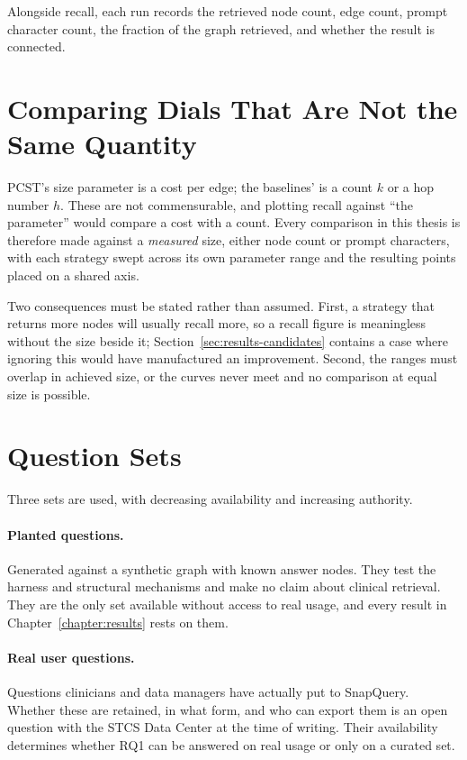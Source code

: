 Alongside recall, each run records the retrieved node count, edge count, prompt
character count, the fraction of the graph retrieved, and whether the result is
connected.

\section{Comparing Dials That Are Not the Same Quantity} \label{sec:methodology-comparability}

PCST's size parameter is a cost per edge; the baselines' is a count $k$ or a hop
number $h$. These are not commensurable, and plotting recall against ``the
parameter'' would compare a cost with a count. Every comparison in this thesis is
therefore made against a \emph{measured} size, either node count or prompt
characters, with each strategy swept across its own parameter range and the
resulting points placed on a shared axis.

Two consequences must be stated rather than assumed. First, a strategy that
returns more nodes will usually recall more, so a recall figure is meaningless
without the size beside it; Section~\ref{sec:results-candidates} contains a case
where ignoring this would have manufactured an improvement. Second, the ranges
must overlap in achieved size, or the curves never meet and no comparison at
equal size is possible.

\section{Question Sets} \label{sec:methodology-questions}

Three sets are used, with decreasing availability and increasing authority.

\paragraph{Planted questions.} Generated against a synthetic graph with known
answer nodes. They test the harness and structural mechanisms and make no claim
about clinical retrieval. They are the only set available without access to real
usage, and every result in Chapter~\ref{chapter:results} rests on them.

\paragraph{Real user questions.} Questions clinicians and data managers have
actually put to SnapQuery. Whether these are retained, in what form, and who can
export them is an open question with the STCS Data Center at the time of writing.
Their availability determines whether RQ1 can be answered on real usage or only
on a curated set.

